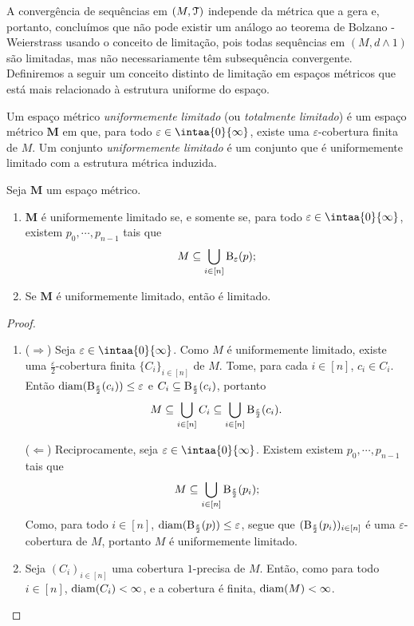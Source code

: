 A convergência de sequências em $(M,\mathcal{T})$ independe da métrica que a gera e, portanto, concluímos que não pode existir um análogo ao teorema de Bolzano - Weierstrass usando o conceito de limitação, pois todas sequências em $(M,d \wedge 1)$ são limitadas, mas não necessariamente têm subsequência convergente. Definiremos a seguir um conceito distinto de limitação em espaços métricos que está mais relacionado à estrutura uniforme do espaço.

\begin{defi}
Um espaço métrico \emph{uniformemente limitado} (ou \emph{totalmente limitado}) é um espaço métrico $\bm M$ em que, para todo $\varepsilon \in \intaa{0}{\infty}$, existe uma $\varepsilon$-cobertura finita de $M$. Um conjunto \emph{uniformemente limitado} é um conjunto que é uniformemente limitado com a estrutura métrica induzida.
\end{defi}

\begin{prop}
Seja $\bm M$ um espaço métrico.
	\begin{enumerate}
	\item $\bm M$ é uniformemente limitado se, e somente se, para todo $\varepsilon \in \intaa{0}{\infty}$, existem $p_0,\cdots,p_{n-1}$ tais que
		\begin{equation*}
		M \subseteq \bigcup_{i \in [n]} \mathrm{B}_\varepsilon(p);
		\end{equation*}
	\item Se $\bm M$ é uniformemente limitado, então é limitado.
	\end{enumerate}
\end{prop}
\begin{proof}
	\begin{enumerate}
	\item ($\Rightarrow$) Seja $\varepsilon \in \intaa{0}{\infty}$. Como $M$ é uniformemente limitado, existe uma $\frac{\varepsilon}{2}$-cobertura finita $\{C_i\}_{i \in [n]}$ de $M$. Tome, para cada $i \in [n]$, $c_i \in C_i$. Então $\operatorname{diam}(\mathrm{B}_{\frac{\varepsilon}{2}}(c_i)) \leq \varepsilon$ e $C_i \subseteq \mathrm{B}_{\frac{\varepsilon}{2}}(c_i)$, portanto
	\begin{equation*}
	M \subseteq \bigcup_{i \in [n]} C_i \subseteq \bigcup_{i \in [n]} \mathrm{B}_{\frac{\varepsilon}{2}}(c_i).
	\end{equation*}

($\Leftarrow$) Reciprocamente, seja $\varepsilon \in \intaa{0}{\infty}$. Existem existem $p_0,\cdots,p_{n-1}$ tais que
		\begin{equation*}
		M \subseteq \bigcup_{i \in [n]} \mathrm{B}_{\frac{\varepsilon}{2}}(p_i);
		\end{equation*}
Como, para todo $i \in [n]$, $\operatorname{diam}(\mathrm{B}_{\frac{\varepsilon}{2}}(p)) \leq \varepsilon$, segue que $(\mathrm{B}_{\frac{\varepsilon}{2}}(p_i))_{i \in [n]}$ é uma $\varepsilon$-cobertura de $M$, portanto $M$ é uniformemente limitado.
	
	\item Seja $(C_i)_{i \in [n]}$ uma cobertura $1$-precisa de $M$. Então, como para todo $i \in [n]$, $\operatorname{diam}(C_i) < \infty$, e a cobertura é finita, $\operatorname{diam}(M) < \infty$.
	\end{enumerate}
\end{proof}

